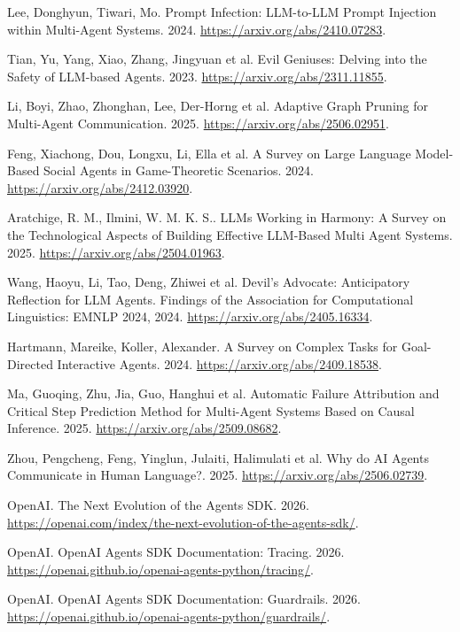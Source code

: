  Lee, Donghyun, Tiwari, Mo. Prompt Infection: {LLM}-to-{LLM} Prompt Injection within Multi-Agent Systems. 2024. \url{https://arxiv.org/abs/2410.07283}.

 Tian, Yu, Yang, Xiao, Zhang, Jingyuan et al. Evil Geniuses: Delving into the Safety of {LLM}-based Agents. 2023. \url{https://arxiv.org/abs/2311.11855}.

 Li, Boyi, Zhao, Zhonghan, Lee, Der-Horng et al. Adaptive Graph Pruning for Multi-Agent Communication. 2025. \url{https://arxiv.org/abs/2506.02951}.

 Feng, Xiachong, Dou, Longxu, Li, Ella et al. A Survey on Large Language Model-Based Social Agents in Game-Theoretic Scenarios. 2024. \url{https://arxiv.org/abs/2412.03920}.

 Aratchige, R. M., Ilmini, W. M. K. S.. {LLM}s Working in Harmony: A Survey on the Technological Aspects of Building Effective {LLM}-Based Multi Agent Systems. 2025. \url{https://arxiv.org/abs/2504.01963}.

 Wang, Haoyu, Li, Tao, Deng, Zhiwei et al. Devil's Advocate: Anticipatory Reflection for {LLM} Agents. Findings of the Association for Computational Linguistics: EMNLP 2024, 2024. \url{https://arxiv.org/abs/2405.16334}.

 Hartmann, Mareike, Koller, Alexander. A Survey on Complex Tasks for Goal-Directed Interactive Agents. 2024. \url{https://arxiv.org/abs/2409.18538}.

 Ma, Guoqing, Zhu, Jia, Guo, Hanghui et al. Automatic Failure Attribution and Critical Step Prediction Method for Multi-Agent Systems Based on Causal Inference. 2025. \url{https://arxiv.org/abs/2509.08682}.

 Zhou, Pengcheng, Feng, Yinglun, Julaiti, Halimulati et al. Why do {AI} Agents Communicate in Human Language?. 2025. \url{https://arxiv.org/abs/2506.02739}.

 {OpenAI}. The Next Evolution of the {Agents SDK}. 2026. \url{https://openai.com/index/the-next-evolution-of-the-agents-sdk/}.

 {OpenAI}. {OpenAI Agents SDK} Documentation: Tracing. 2026. \url{https://openai.github.io/openai-agents-python/tracing/}.

 {OpenAI}. {OpenAI Agents SDK} Documentation: Guardrails. 2026. \url{https://openai.github.io/openai-agents-python/guardrails/}.

